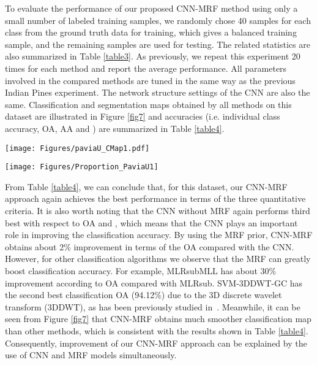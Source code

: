 \documentclass[journal]{IEEEtran}
\begin{document}
	
		To evaluate the performance of our proposed CNN-MRF method using only a small number of labeled training samples, we randomly chose 40 samples for each class from the ground truth data for training, which gives a balanced training sample, and the remaining samples are used for testing. The related statistics are also summarized in Table \ref{table3}. As previously, we repeat this experiment 20 times for each method and report the average performance. All parameters involved in the compared methods are tuned in the same way as the previous Indian Pines experiment. The network structure settings of the CNN are also the same. Classification and segmentation maps obtained by all methods on this dataset are illustrated in Figure  \ref{fig7} and accuracies (i.e. individual class accuracy, OA, AA and ) are summarized in Table \ref{table4}.
		
		
		\begin{figure*}
			\centering
			\texttt{[image: Figures/paviaU\_CMap1.pdf]}
			\caption{{{Classification maps obtained by all competing methods on the Pavia University dataset (overall accuracies are reported in parentheses).}}}\label{fig7}
		\end{figure*}
		
		\begin{figure*}[t]
			\centering
			\texttt{[image: Figures/Proportion\_PaviaU1]}
			\caption{{{Overall accuracy (\%) obtained by all competing methods with different proportions of training samples on Pavia University dataset. (a) Classification results. (b) {{Regularized classification}} results.}}}\label{fig8}
		\end{figure*}
		
		From Table \ref{table4}, we can conclude that, for this dataset, our CNN-MRF approach again achieves the best performance in terms of the three quantitative criteria. It is also worth noting that the CNN without MRF again performs third best with respect to OA and , which means that the CNN plays {{an important}} role in improving the classification accuracy. By using the MRF prior, CNN-MRF obtains about 2\% improvement in terms of the OA compared with the CNN. However, for other {{classification}} algorithms we observe that the MRF can greatly boost classification accuracy. For example, MLRsubMLL has about 30\% improvement according to OA compared with MLRsub. SVM-3DDWT-GC has the second best {{classification}} OA (94.12\%) due to the 3D discrete wavelet transform (3DDWT), as has been previously studied in~\cite{cao2017integration}. Meanwhile, it can be seen from Figure  \ref{fig7} that CNN-MRF obtains much smoother {{classification}} map than other 
		methods, which is consistent with the results shown in Table \ref{table4}. Consequently, improvement of our CNN-MRF approach can be explained by the use of CNN and MRF models simultaneously. 
		
\end{document}
